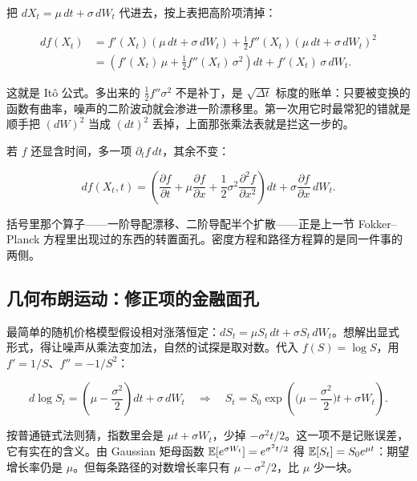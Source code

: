 把 \(dX_t=\mu\,dt+\sigma\,dW_t\) 代进去，按上表把高阶项清掉：

\[
\begin{aligned}
df(X_t)&=f'(X_t)(\mu\,dt+\sigma\,dW_t)+\frac12f''(X_t)(\mu\,dt+\sigma\,dW_t)^2\\
&=\left(f'(X_t)\,\mu+\frac12f''(X_t)\,\sigma^2\right)dt+f'(X_t)\,\sigma\,dW_t.
\end{aligned}
\]

这就是 Itô 公式。多出来的 \(\tfrac12f''\sigma^2\) 不是补丁，是 \(\sqrt{\Delta t}\) 标度的账单：只要被变换的函数有曲率，噪声的二阶波动就会渗进一阶漂移里。第一次用它时最常犯的错就是顺手把 \((dW)^2\) 当成 \((dt)^2\) 丢掉，上面那张乘法表就是拦这一步的。

若 \(f\) 还显含时间，多一项 \(\partial_tf\,dt\)，其余不变：

\[
df(X_t,t)=\left(\frac{\partial f}{\partial t}+\mu\frac{\partial f}{\partial x}
+\frac12\sigma^2\frac{\partial^2f}{\partial x^2}\right)dt+\sigma\frac{\partial f}{\partial x}\,dW_t.
\]

括号里那个算子——一阶导配漂移、二阶导配半个扩散——正是上一节 Fokker--Planck 方程里出现过的东西的转置面孔。密度方程和路径方程算的是同一件事的两侧。

\subsection{几何布朗运动：修正项的金融面孔}

最简单的随机价格模型假设相对涨落恒定：\(dS_t=\mu S_t\,dt+\sigma S_t\,dW_t\)。想解出显式形式，得让噪声从乘法变加法，自然的试探是取对数。代入 \(f(S)=\log S\)，用 \(f'=1/S\)、\(f''=-1/S^2\)：

\[
d\log S_t=\left(\mu-\frac{\sigma^2}{2}\right)dt+\sigma\,dW_t
\quad\Longrightarrow\quad
S_t=S_0\exp\!\left(\Big(\mu-\frac{\sigma^2}{2}\Big)t+\sigma W_t\right).
\]

按普通链式法则猜，指数里会是 \(\mu t+\sigma W_t\)，少掉 \(-\sigma^2t/2\)。这一项不是记账误差，它有实在的含义。由 Gaussian 矩母函数 \(\mathbb{E}[e^{\sigma W_t}]=e^{\sigma^2t/2}\) 得 \(\mathbb{E}[S_t]=S_0e^{\mu t}\)：期望增长率仍是 \(\mu\)。但每条路径的对数增长率只有 \(\mu-\sigma^2/2\)，比 \(\mu\) 少一块。

